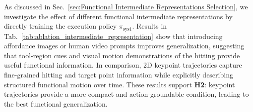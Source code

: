 \begin{table}
\vspace{-1.0em}
\centering
\caption{\textbf{Ablation Results on Functional Intermediate Representations.} We condition FM on different representations and report the SR on 3 unseen tools.}
\label{tab:ablation_intermediate_representation}
\vspace{-1.0em}
\end{table}

As discussed in Sec.~\ref{sec:Functional Intermediate Representations Selection}, we investigate the effect of different functional intermediate representations by directly training the execution policy $\pi_{\mathrm{sys1}}$. 
Results in Tab.~\ref{tab:ablation_intermediate_representation} show that introducing affordance images or human video prompts improves generalization, suggesting that tool-region cues and visual motion demonstrations of the hitting provide useful functional information.
In comparison, 2D keypoint trajectories capture fine-grained hitting and target point information while explicitly describing structured functional motion over time. These results support \textbf{H2}: keypoint trajectories provide a more compact and action-groundable condition, leading to the best functional generalization.


